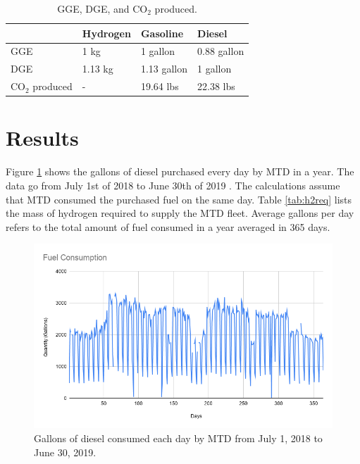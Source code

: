 \documentclass{anstrans}
\begin{document}
\begin{table}[!h]
	\centering
    \caption{GGE, DGE, and CO$_2$ produced.}
    \label{tab:meth}
	\begin{tabular}{l|lll}
	\hline
	                 & Hydrogen & Gasoline    & Diesel      \\ \hline
	GGE              & 1 kg     & 1 gallon    & 0.88 gallon \\
	DGE              & 1.13 kg  & 1.13 gallon & 1 gallon    \\
    CO$_2$ produced  & -        & 19.64 lbs   & 22.38 lbs   \\ \hline

	\end{tabular}
\end{table}

\section{Results}

Figure \ref{fig:mtdfuel} shows the gallons of diesel purchased every day by MTD in a year. The data go from July 1st of 2018 to June 30th of 2019 \cite{mtd_irecords_2019}. The calculations assume that MTD consumed the purchased fuel on the same day.
Table \ref{tab:h2req} lists the mass of hydrogen required to supply the MTD fleet. Average gallons per day refers to the total amount of fuel consumed in a year averaged in 365 days. 

\begin{figure}[!h]
	\centering
	\includegraphics[width=1.05\linewidth]{figures/fuelconsumption.png}
	\hfill
	\caption{Gallons of diesel consumed each day by MTD from July 1, 2018 to June 30, 2019.}
	\label{fig:mtdfuel}
\end{figure}
\end{document}
